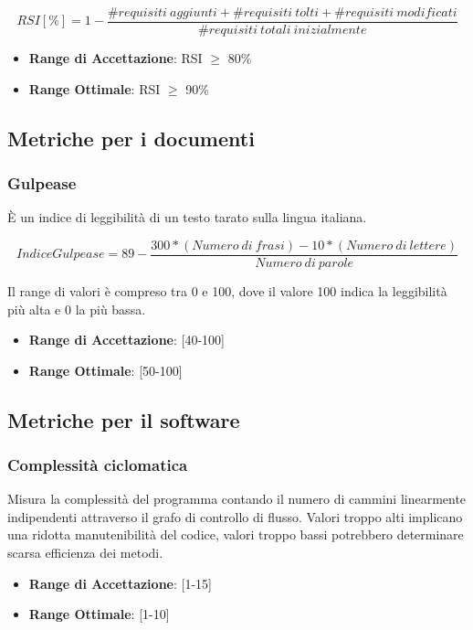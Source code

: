 \documentclass[12pt,a4paper]{article}
\begin{document}
	\[RSI[\%]= 1 - \frac{\#requisiti\ aggiunti+\#requisiti\ tolti+\#requisiti\ modificati}{\#requisiti\ totali\ inizialmente}\]
	
	\begin{itemize}
		\item \textbf{Range di Accettazione}: RSI $\geq$ 80\%
		\item \textbf{Range Ottimale}: RSI $\geq$ 90\%
	\end{itemize}
	
	\subsection{Metriche per i documenti}\label{metriche_doc}
	
	\subsubsection{Gulpease}
	È un indice di leggibilità di un testo tarato sulla lingua italiana.
	
	\[IndiceGulpease=89-\frac{300*(Numero\ di\ frasi)-10*(Numero\ di\ lettere)}{Numero\ di\ parole}\]
	
	Il range di valori è compreso tra 0 e 100, dove il valore 100 indica la leggibilità più alta e 0 la più bassa.
	
	\begin{itemize}
		\item \textbf{Range di Accettazione}: [40-100]
		\item \textbf{Range Ottimale}: [50-100]
	\end{itemize}
	
	\subsection{Metriche per il software}\label{metriche_sw}
	
	\subsubsection{Complessità ciclomatica}
	Misura la complessità del programma contando il numero di cammini linearmente indipendenti attraverso il grafo di controllo di flusso. Valori troppo alti implicano una ridotta manutenibilità del codice, valori troppo bassi potrebbero determinare scarsa efficienza dei metodi.
	
	\begin{itemize}
		\item \textbf{Range di Accettazione}: [1-15]
		\item \textbf{Range Ottimale}: [1-10]
	\end{itemize}
	
\end{document}
